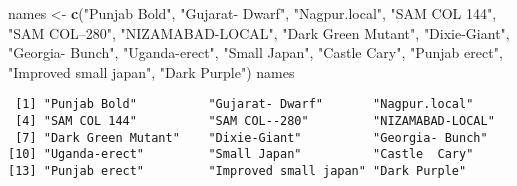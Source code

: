\documentclass[
]{article}
\newenvironment{Shaded}{\begin{snugshade}}{\end{snugshade}}
\newcommand{\KeywordTok}[1]{\textcolor[rgb]{0.13,0.29,0.53}{\textbf{#1}}}
\newcommand{\NormalTok}[1]{#1}
\newcommand{\StringTok}[1]{\textcolor[rgb]{0.31,0.60,0.02}{#1}}
\begin{document}
\begin{Shaded}
\begin{Highlighting}[]
\NormalTok{names <-}\StringTok{ }\KeywordTok{c}\NormalTok{(}\StringTok{"Punjab Bold"}\NormalTok{, }\StringTok{"Gujarat- Dwarf"}\NormalTok{, }\StringTok{"Nagpur.local"}\NormalTok{, }\StringTok{"SAM COL 144"}\NormalTok{,}
           \StringTok{"SAM COL--280"}\NormalTok{, }\StringTok{"NIZAMABAD-LOCAL"}\NormalTok{, }\StringTok{"Dark Green Mutant"}\NormalTok{,}
           \StringTok{"Dixie-Giant"}\NormalTok{, }\StringTok{"Georgia- Bunch"}\NormalTok{, }\StringTok{"Uganda-erect"}\NormalTok{, }\StringTok{"Small Japan"}\NormalTok{,}
           \StringTok{"Castle  Cary"}\NormalTok{, }\StringTok{"Punjab erect"}\NormalTok{, }\StringTok{"Improved small japan"}\NormalTok{,}
           \StringTok{"Dark Purple"}\NormalTok{)}
\NormalTok{names}
\end{Highlighting}
\end{Shaded}

\begin{verbatim}
 [1] "Punjab Bold"          "Gujarat- Dwarf"       "Nagpur.local"        
 [4] "SAM COL 144"          "SAM COL--280"         "NIZAMABAD-LOCAL"     
 [7] "Dark Green Mutant"    "Dixie-Giant"          "Georgia- Bunch"      
[10] "Uganda-erect"         "Small Japan"          "Castle  Cary"        
[13] "Punjab erect"         "Improved small japan" "Dark Purple"         
\end{verbatim}
\end{document}
